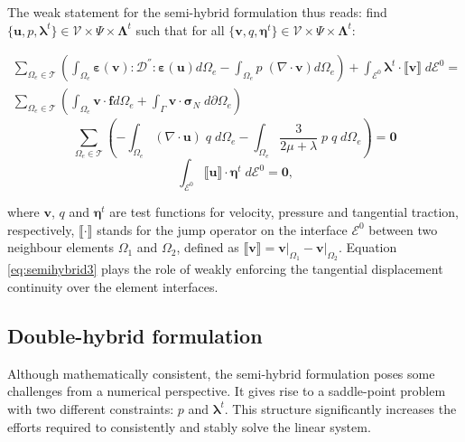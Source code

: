 \documentclass{wccm2024}
\begin{document}
The weak statement for the semi-hybrid formulation thus reads: find $\{\mathbf{u},p,\boldsymbol{\lambda}^t\} \in \mathcal{V} \times \Psi \times \boldsymbol{\Lambda}^t$ such that for all $\{\mathbf{v},q,\boldsymbol{\eta}^t\} \in \mathcal{V}\times \Psi \times \boldsymbol{\Lambda}^t$:

\begin{equation} \label{eq:semihybrid1}
    \begin{split}
        \sum_{\Omega_e \in \mathcal{T}} \left( \int_{\Omega_e} \boldsymbol{\varepsilon}(\mathbf{v}) : \mathcal{D}^{''} : \boldsymbol{\varepsilon}(\mathbf{u}) d\Omega_e - \int_{\Omega_e} p\; (\nabla \cdot \mathbf{v}) d\Omega_e \right) + \int_{\mathcal{E}^0} \boldsymbol{\lambda}^t \cdot \llbracket \mathbf{v} \rrbracket \;d\mathcal{E}^0 = \\ \sum_{\Omega_e \in \mathcal{T}} \left( \int_{\Omega_e} \mathbf{v} \cdot \mathbf{f} d\Omega_e + \int_{\Gamma} \mathbf{v} \cdot \boldsymbol{\sigma}_N \; d\partial\Omega_e \right)
    \end{split}
\end{equation}
\begin{equation} \label{eq:semihybrid2}
    \sum_{\Omega_e \in \mathcal{T}} \left(-\int_{\Omega_e} (\nabla \cdot \mathbf{u}) \;q\; d\Omega_e -\int_{\Omega_e} \frac{3}{2\mu+\lambda}\;p\; q\; d\Omega_e \right) = \mathbf{0}
\end{equation}
\begin{equation} \label{eq:semihybrid3}
    \int_{\mathcal{E}^0} \llbracket \mathbf{u} \rrbracket \cdot \mathbf{\eta}^t \;d\mathcal{E}^0 = \mathbf{0} \text{,}
\end{equation}

\noindent where $\mathbf{v}$, $q$ and $\boldsymbol{\eta}^t$ are test functions for velocity, pressure and tangential traction, respectively, $\llbracket \cdot \rrbracket$ stands for the jump operator on the interface $\mathcal{E}^0$ between two neighbour elements $\Omega_1$ and $\Omega_2$, defined as $\llbracket \mathbf{v} \rrbracket = \mathbf{v} \vert_{\Omega_1} - \mathbf{v} \vert_{\Omega_2}$. Equation \eqref{eq:semihybrid3} plays the role of weakly enforcing the tangential displacement continuity over the element interfaces.

\subsection{Double-hybrid formulation}

Although mathematically consistent, the semi-hybrid formulation poses some challenges from a numerical perspective. It gives rise to a saddle-point problem with two different constraints: $p$ and $\boldsymbol{\lambda}^t$. This structure significantly increases the efforts required to consistently and stably solve the linear system.
\end{document}
